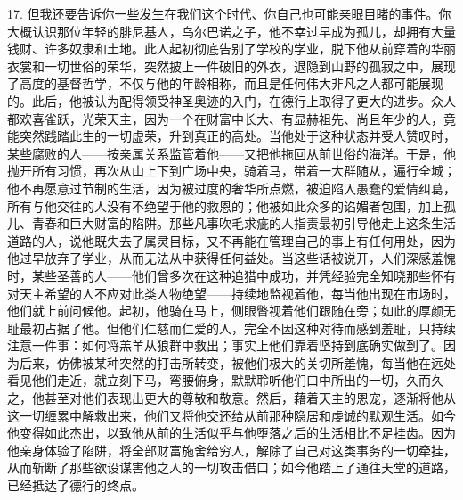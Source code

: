 17. 但我还要告诉你一些发生在我们这个时代、你自己也可能亲眼目睹的事件。你大概认识那位年轻的腓尼基人，乌尔巴诺之子，他不幸过早成为孤儿，却拥有大量钱财、许多奴隶和土地。此人起初彻底告别了学校的学业，脱下他从前穿着的华丽衣裳和一切世俗的荣华，突然披上一件破旧的外衣，退隐到山野的孤寂之中，展现了高度的基督哲学，不仅与他的年龄相称，而且是任何伟大非凡之人都可能展现的。此后，他被认为配得领受神圣奥迹的入门，在德行上取得了更大的进步。众人都欢喜雀跃，光荣天主，因为一个在财富中长大、有显赫祖先、尚且年少的人，竟能突然践踏此生的一切虚荣，升到真正的高处。当他处于这种状态并受人赞叹时，某些腐败的人——按亲属关系监管着他——又把他拖回从前世俗的海洋。于是，他抛开所有习惯，再次从山上下到广场中央，骑着马，带着一大群随从，遍行全城；他不再愿意过节制的生活，因为被过度的奢华所点燃，被迫陷入愚蠢的爱情纠葛，所有与他交往的人没有不绝望于他的救恩的；他被如此众多的谄媚者包围，加上孤儿、青春和巨大财富的陷阱。那些凡事吹毛求疵的人指责最初引导他走上这条生活道路的人，说他既失去了属灵目标，又不再能在管理自己的事上有任何用处，因为他过早放弃了学业，从而无法从中获得任何益处。当这些话被说开，人们深感羞愧时，某些圣善的人——他们曾多次在这种追猎中成功，并凭经验完全知晓那些怀有对天主希望的人不应对此类人物绝望——持续地监视着他，每当他出现在市场时，他们就上前问候他。起初，他骑在马上，侧眼瞥视着他们跟随在旁；如此的厚颜无耻最初占据了他。但他们仁慈而仁爱的人，完全不因这种对待而感到羞耻，只持续注意一件事：如何将羔羊从狼群中救出；事实上他们靠着坚持到底确实做到了。因为后来，仿佛被某种突然的打击所转变，被他们极大的关切所羞愧，每当他在远处看见他们走近，就立刻下马，弯腰俯身，默默聆听他们口中所出的一切，久而久之，他甚至对他们表现出更大的尊敬和敬意。然后，藉着天主的恩宠，逐渐将他从这一切缠累中解救出来，他们又将他交还给从前那种隐居和虔诚的默观生活。如今他变得如此杰出，以致他从前的生活似乎与他堕落之后的生活相比不足挂齿。因为他亲身体验了陷阱，将全部财富施舍给穷人，解除了自己对这类事务的一切牵挂，从而斩断了那些欲设谋害他之人的一切攻击借口；如今他踏上了通往天堂的道路，已经抵达了德行的终点。\par

